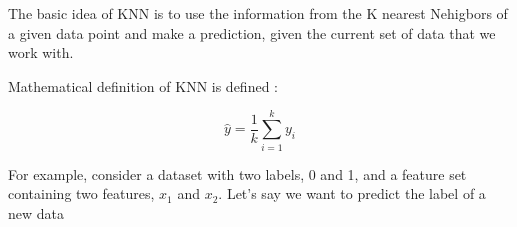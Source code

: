 The basic idea of KNN is to use the information from the K nearest Nehigbors of a given data point and make a prediction, given the current set of data that we work with.

\begin{definition}
	Mathematical definition of KNN is defined :

	\begin{displaymath}
		\hat{y}  = \frac{1}{k} \sum_{i=1}^k y_i
	\end{displaymath}
\end{definition}

For example, consider a dataset with two labels, 0 and 1, and a feature set containing two features, $x_1$ and $x_2$. Let's say we want to predict the label of a new data
